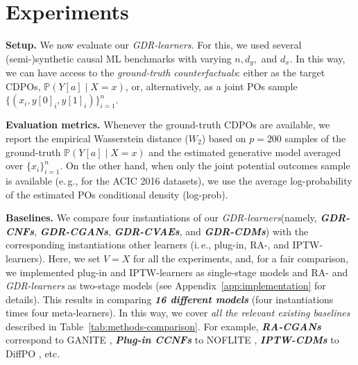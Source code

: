 \documentclass[dvipsnames]{article} %
\newcommand\ie{i.\,e.\xspace}
\newcommand\eg{e.\,g.\xspace}
\newcommand{\GDRlearners}{\emph{GDR-learners}\xspace}
\newcommand{\CDPOs}{CDPOs\xspace}
\begin{document}
\vspace{-0.1cm}
\section{Experiments}
\vspace{-0.1cm}

\textbf{Setup.} We now evaluate our \GDRlearners. For this, we used several (semi-)synthetic causal ML benchmarks with varying $n, d_y,$ and $d_x$. In this way, we can have access to the \emph{ground-truth counterfactuals}: either as the target \CDPOs, $\mathbb{P}(Y[a] \mid X = x)$, or, alternatively, as a joint POs sample $\{(x_i, y[0]_i, y[1]_i)\}_{i=1}^{n}$. 

\begin{table}
    \centering
    \vspace{-0.8cm}
    \caption{Aggregated results for 77 semi-synthetic \textbf{ACIC 2016 experiments} in \emph{(a)~full} and \emph{(b)~linear} settings. Reported: the $\%$ of runs, where our \GDRlearners improve over other learners wrt. the out-sample log-prob. Detailed results are in Fig.~\ref{fig:res-acic-full} in Appendix~\ref{app:experiments}.}
    \vspace{-0.2cm}
    \scalebox{0.8}{}
    \label{tab:res-acic-perc}
    \vspace{-0.5cm}
\end{table}

\textbf{Evaluation metrics.} Whenever the ground-truth \CDPOs are available, we report the empirical Wasserstein distance ($W_2$) based on $p=200$ samples of the ground-truth $\mathbb{P}(Y[a] \mid X = x)$ and the estimated generative model averaged over $\{x_i\}_{i=1}^n$. On the other hand, when only the joint potential outcomes sample is available (\eg, for the ACIC 2016 datasets), we use the average log-probability of the estimated POs conditional density (log-prob).



\textbf{Baselines.} We compare four instantiations of our \GDRlearners (namely, \textbf{\emph{GDR-CNFs}}, \textbf{\emph{GDR-CGANs}}, \textbf{\emph{GDR-CVAEs}}, and \textbf{\emph{GDR-CDMs}}) with the corresponding instantiations other learners (\ie, {plug-in}, {RA-}, and {IPTW-learners}). Here, we set $V = X$ for all the experiments, and, for a fair comparison, we implemented {plug-in} and {IPTW}-learners as single-stage models and {RA-} and \GDRlearners as two-stage models (see Appendix~\ref{app:implementation} for details).
This results in comparing \textbf{\emph{16 different models}} (four instantiations times four meta-learners). In this way, we cover \emph{all the relevant existing baselines} described in Table~\ref{tab:methods-comparison}. For example, \textbf{\emph{RA-CGANs}} correspond to GANITE \citep{yoon2018ganite}, \textbf{\emph{Plug-in CCNFs}} to NOFLITE \citep{vanderschueren2023noflite}, \textbf{\emph{IPTW-CDMs}} to DiffPO \citep{ma2024diffpo}, etc.  
\end{document}

